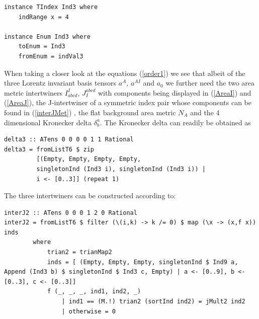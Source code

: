 \documentclass[a4paper,12pt, DIV=14, BCOR=5mm, twoside, headsepline]{scrbook}
\begin{document}
\begin{samepage}
\begin{verbatim}
instance TIndex Ind3 where
    indRange x = 4

instance Enum Ind3 where
    toEnum = Ind3
    fromEnum = indVal3
\end{verbatim} 
\end{samepage}

When taking a closer look at the equations (\ref{order1}) we see that albeit of the three Lorentz invariant basis tensors $a^{A}$, $a^{AI}$ and $a_0$ we further need the two area metric intertwiners $I^I_{abcd}$, $J_I^{abcd}$ with components being displayed in (\ref{AreaI}) and (\ref{AreaJ}), the J-intertwiner of a symmetric index pair whose components can be found in (\ref{interJMet})  , the flat background area metric $N_A$ and the 4 dimensional Kronecker delta $\delta^a_b$. 
The Kronecker delta can readily be obtained as 

\begin{samepage}
\begin{verbatim}
delta3 :: ATens 0 0 0 0 1 1 Rational
delta3 = fromListT6 $ zip
         [(Empty, Empty, Empty, Empty,
         singletonInd (Ind3 i), singletonInd (Ind3 i)) | 
         i <- [0..3]] (repeat 1)
\end{verbatim} 
\end{samepage}

The three intertwiners can be constructed according to:

\begin{samepage}
\begin{verbatim}
interJ2 :: ATens 0 0 0 1 2 0 Rational
interJ2 = fromListT6 $ filter (\(i,k) -> k /= 0) $ map (\x -> (x,f x)) inds
        where
            trian2 = trianMap2
            inds = [ (Empty, Empty, Empty, singletonInd $ Ind9 a, Append (Ind3 b) $ singletonInd $ Ind3 c, Empty) | a <- [0..9], b <- [0..3], c <- [0..3]]
            f (_, _, _, ind1, ind2, _)
                | ind1 == (M.!) trian2 (sortInd ind2) = jMult2 ind2
                | otherwise = 0
\end{verbatim} 
\end{samepage}
\end{document}
